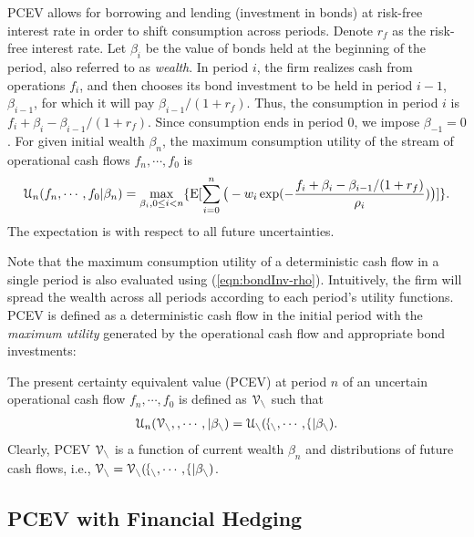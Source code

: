 \documentclass[mnsc,nonblindrev,copyedit]{informs2_wz} %
\newcommand{\E}{\mathrm{E}}
\newcommand{\V}{\cal{V}}
\begin{document}
PCEV allows for borrowing and lending (investment in bonds) at risk-free interest rate in order to shift consumption across periods.  
Denote $r_f$ as the  risk-free interest rate.
Let $\beta_i$ be the value of bonds held at the beginning of the period, also referred to as {\em wealth}.  In period $i$, the firm realizes cash from operations $f_i$,   and then chooses its bond investment to be held in period $i-1$, $\beta_{i-1}$, for which it will pay $\beta_{i-1}/(1+r_f)$.  
Thus, the consumption in period $i$ is $f_i + \beta_{i} -\beta_{i-1}/(1+r_f)$.  Since consumption ends in period $0$, we impose $\beta_{-1} =0$. For given initial wealth $\beta_{n}$,  the maximum consumption utility of the stream of operational cash flows $ f_n, \cdots, f_0$ is
\begin{eqnarray} 
     \label{eqn:bondInv-rho}
\mathcal{U}_n(f_n, \cdots, f_0|\beta_{n}) = \max_{\beta_{i}, 0 \leq i < n} \{\E [ \sum_{i=0}^n \big{(}-w_i \exp (-\frac{f_i + \beta_{i} -\beta_{i-1}/(1+r_f)}{\rho_i})\big{)}]\}.
\end{eqnarray}
The expectation is with respect to all future uncertainties.

Note that the maximum consumption utility of a deterministic cash flow in a single period is also evaluated using (\ref{eqn:bondInv-rho}).  Intuitively, the firm will spread the wealth across all periods according to each period's utility functions.
PCEV is defined as a deterministic cash flow in the initial period with the {\em maximum utility} generated by the operational cash flow and appropriate bond investments:

\begin{definition}
    \label{def:PCEV}
The present certainty equivalent value (PCEV) at period $n$ of an uncertain operational cash flow $f_n, \cdots, f_0$ is defined as $\V_n$ such that \vspace{-0.14in}
\begin{eqnarray} 
     \label{eqn:PCEV}
\mathcal{U}_n(\V_n, 0, \cdots, 0|\beta_{n}) = \mathcal{U}_n(f_n, \cdots, f_0|\beta_{n}).
\end{eqnarray}
Clearly, PCEV $\V_n$ is a function of current wealth $\beta_n$ and distributions of future cash flows, i.e., $\V_n = \V_n(f_n, \cdots, f_0|\beta_{n})$.  
\end{definition}





\subsection{PCEV with Financial Hedging}
\end{document}
